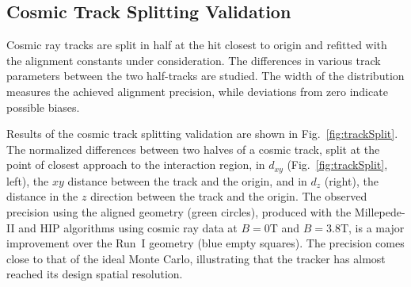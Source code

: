 \subsection{Cosmic Track Splitting Validation}
\label{sec:AlRes_trackSplit}

Cosmic ray tracks are split in half at the hit closest to origin and refitted with the alignment constants under consideration. The differences in various track parameters between the two half-tracks are studied. The width of the distribution measures the achieved alignment precision, while deviations from zero indicate possible biases. 

Results of the cosmic track splitting validation are shown in Fig.~\ref{fig:trackSplit}. The normalized differences between two halves of a cosmic track, split at the point of closest approach to the interaction region, in $d_{xy}$ (Fig.~\ref{fig:trackSplit}, left), the $xy$ distance between the track and the origin, and in $d_z$ (right), the distance in the $z$ direction between the track and the origin. The observed precision using the aligned geometry (green circles), produced with the Millepede-II and HIP algorithms using cosmic ray data at $B=0$T and $B=3.8$T, is a major improvement over the Run~I geometry (blue empty squares). The precision comes close to that of the ideal Monte Carlo, illustrating that the tracker has almost reached its design spatial resolution.

